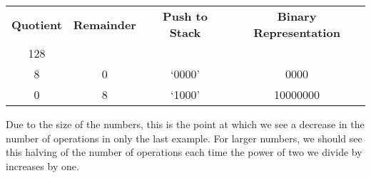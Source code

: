 \documentclass[12pt]{article}
\begin{document}
\begin{center}
  \begin{tabular}{c|c|c|c}
    \textbf{Quotient} & \textbf{Remainder} & \textbf{Push to Stack} & \textbf{Binary Representation} \\
    128 &   &        & \\
    8   & 0 & `0000' & 0000 \\
    0   & 8 & `1000' & 10000000
  \end{tabular}
\end{center}
Due to the size of the numbers, this is the point at which we see a decrease in the number of operations in only the last example. For larger numbers, we should see this halving of the number of operations each time the power of two we divide by increases by one.
\end{document}
